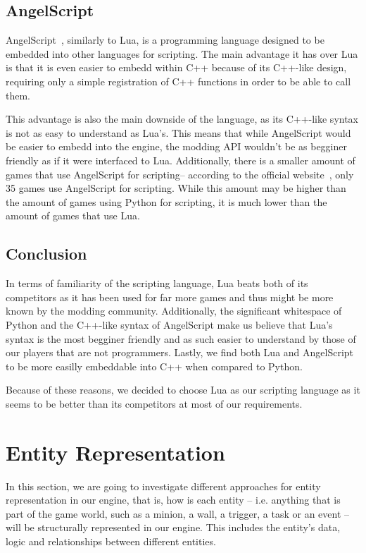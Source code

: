 \subsection{AngelScript}

AngelScript~\cite{AngelScript}, similarly to Lua, is a programming language designed to be embedded into other languages for scripting.
The main advantage it has over Lua is that it is even easier to embedd within C++ because of its C++-like design, requiring only
a simple registration of C++ functions in order to be able to call them.

This advantage is also the main downside of the language, as its C++-like syntax is not as easy to understand as Lua's. This means that while
AngelScript would be easier to embedd into the engine, the modding API wouldn't be as begginer friendly as if it were interfaced
to Lua. Additionally, there is a smaller amount of games that use AngelScript for scripting-- according to the official
website~\cite{AngelScriptGames}, only 35 games use AngelScript for scripting. While this amount may be higher than the amount of games
using Python for scripting, it is much lower than the amount of games that use Lua.

\subsection{Conclusion}

In terms of familiarity of the scripting language, Lua beats both of its competitors as it has been used for far more games and thus
might be more known by the modding community. Additionally, the significant whitespace of Python and the C++-like syntax of AngelScript
make us believe that Lua's syntax is the most begginer friendly and as such easier to understand by those of our players that are not
programmers. Lastly, we find both Lua and AngelScript to be more easilly embeddable into C++ when compared to Python.

Because of these reasons, we decided to choose Lua as our scripting language as it seems to be better than its competitors at most
of our requirements.


\section{Entity Representation}

In this section, we are going to investigate different approaches for entity representation in our engine, that is, how is each
entity -- i.e. anything that is part of the game world, such as a minion, a wall, a trigger, a task or an event -- will be
structurally represented in our engine. This includes the entity's data, logic and relationships between different entities.

